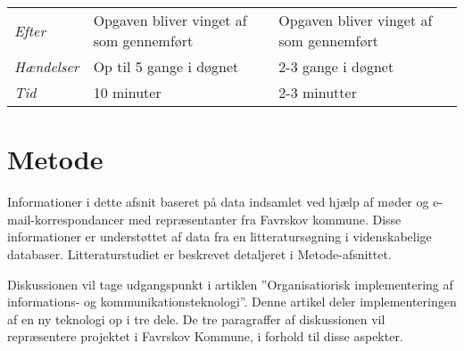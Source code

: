 \begin{table}[]
{\begin{tabular}{l|ll}
\textit{Efter}        & \multicolumn{1}{l|}{Opgaven bliver vinget af som gennemført}                                                                                                                                                                                                   & Opgaven bliver vinget af som gennemført                                                                                                                                                                                                         \\
\textit{Hændelser}    & \multicolumn{1}{l|}{Op til 5 gange i døgnet}                                                                                                                                                                                                                   & 2-3 gange i døgnet                                                                                                                                                                                                                              \\
\textit{Tid}          & \multicolumn{1}{l|}{10 minuter}                                                                                                                                                                                                                                & 2-3 minutter                                                                                                                                                                                                                                   
\end{tabular}%
}
\end{table}


\section{Metode}
Informationer i dette afsnit baseret på data indsamlet ved hjælp af møder og e-mail-korrespondancer med repræsentanter fra Favrskov kommune. Disse informationer er understøttet af data fra en litteratursøgning i videnskabelige databaser. Litteraturstudiet er beskrevet detaljeret i Metode-afsnittet. 

Diskussionen vil tage udgangspunkt i artiklen ”Organisatiorisk implementering af informations- og kommunikationsteknologi”. Denne artikel deler implementeringen af en ny teknologi op i tre dele. De tre paragraffer af diskussionen vil repræsentere projektet i Favrskov Kommune, i forhold til disse aspekter. 

